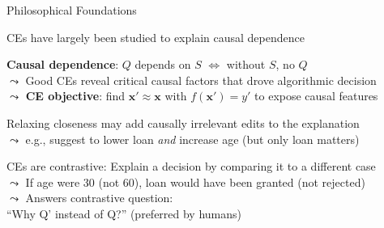 \documentclass[10pt,compress,t,notes=noshow, xcolor=table]{beamer}
\begin{document}
\begin{framev}[align=top]{Philosophical Foundations}
\begin{itemizeM}
\item<1-> CEs have largely been studied to explain causal dependence
\item<1-> \textbf{Causal dependence}: $Q$ depends on $S$ $\Leftrightarrow$ without $S$, no $Q$\\
$\leadsto$ Good CEs reveal critical causal factors that drove algorithmic decision\\
$\leadsto$ \textbf{CE objective}: find $\mathbf{x}' \!\approx\! \mathbf{x}$ with $f(\mathbf{x}') = y'$ to expose causal features
\item<2-> Relaxing closeness may add causally irrelevant edits to the explanation\\
$\leadsto$ e.g., suggest to lower loan \emph{and} increase age (but only loan matters)
\item<3-> CEs are contrastive: Explain a decision by comparing it to a different case\\
$\leadsto$ If age were 30 (not 60), loan would have been granted (not rejected)\\%
$\leadsto$ Answers contrastive question: \\``Why Q' instead of Q?'' (preferred by humans)
\end{itemizeM}
\end{framev}



\end{document}
